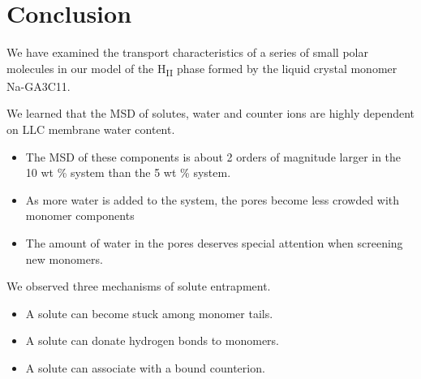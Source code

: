 \documentclass{article}
\begin{document}
  \section{Conclusion}

  We have examined the transport characteristics of a series of small polar
  molecules in our model of the H\textsubscript{II} phase formed by the liquid 
  crystal monomer Na-GA3C11.

  We learned that the MSD of solutes, water and counter ions are highly dependent 
  on LLC membrane water content.
  \begin{itemize}    
    \item The MSD of these components is about 2 orders of magnitude larger in the 
    10 wt \% system than the 5 wt \% system.
    \item As more water is added to the system, the pores become less crowded
    with monomer components %
    \item The amount of water in the pores deserves special attention when 
    screening new monomers.
  \end{itemize}

  
  We observed three mechanisms of solute entrapment.
  \begin{itemize}
    \item A solute can become stuck among monomer tails. 
    \item A solute can donate hydrogen bonds to monomers.
    \item A solute can associate with a bound counterion.
  \end{itemize}
  
\end{document}
